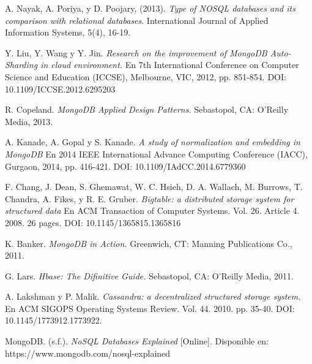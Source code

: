 \documentclass[conference,compsoc]{sty/IEEEtran}
\begin{document}
\begin{thebibliography}{1}
A. Nayak, A. Poriya, y D. Poojary, (2013). \emph{Type of NOSQL databases and its comparison with relational databases}. International Journal of Applied Information Systems, 5(4), 16-19.

Y. Liu, Y. Wang y Y. Jin. \emph{Research on the improvement of MongoDB Auto-Sharding in cloud environment.} En 7th International Conference on Computer Science and Education (ICCSE), Melbourne, VIC, 2012, pp. 851-854. DOI: 10.1109/ICCSE.2012.6295203

R. Copeland. \emph{MongoDB Applied Design Patterns.} Sebastopol, CA: O’Reilly Media, 2013.

A. Kanade, A. Gopal y S. Kanade. \emph{A study of normalization and embedding in MongoDB} En 2014 IEEE International Advance Computing Conference (IACC), Gurgaon, 2014, pp. 416-421. DOI: 10.1109/IAdCC.2014.6779360

F. Chang, J. Dean, S. Ghemawat, W. C. Hsieh, D. A.  Wallach, M. Burrows, T. Chandra, A. Fikes, y R. E. Gruber. \emph{Bigtable: a distributed storage system for structured data} En ACM Transaction of Computer Systems. Vol. 26. Article 4. 2008. 26 pages. DOI: 10.1145/1365815.1365816

K. Banker. \emph{MongoDB in Action.} Greenwich, CT: Manning Publications Co., 2011.

G. Lars. \emph{Hbase: The Difinitive Guide.} Sebastopol, CA: O’Reilly Media, 2011.

A. Lakshman y P. Malik. \emph{Cassandra: a decentralized structured storage system.} En ACM SIGOPS Operating Systems Review. Vol. 44. 2010. pp. 35-40. DOI: 10.1145/1773912.1773922.

MongoDB. (s.f.). \emph{NoSQL Databases Explained} [Online]. Disponible en: https://www.mongodb.com/nosql-explained


\end{thebibliography}
\end{document}
